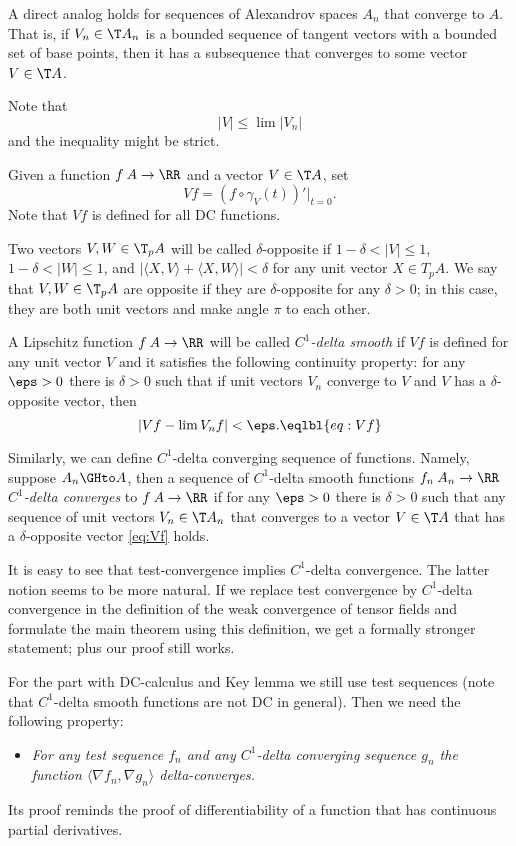 A direct analog holds for sequences of Alexandrov spaces $A_n$ that converge to $A$.
That is, if $V_n\in \T A_n$ is a bounded sequence of tangent vectors with a bounded set of base points, then it has a subsequence that converges to some vector $V\in \T A$.

Note that 
\[|V|\le \lim |V_n|\]
and the inequality might be strict.




Given a function $f\:A\to \RR$ and a vector $V\in \T A$, set
\[Vf=(f\circ\gamma_V(t))'|_{t=0}.\]
Note that $Vf$ is defined for all DC functions.

Two vectors $V,W\in \T_pA$ will be called $\delta$-opposite if
$1-\delta< |V|\le 1$,
$1-\delta< |W|\le 1$,
and $|\langle X,V\rangle +\langle X,W\rangle|<\delta$ for any unit vector $X\in T_p A$.
We say that $V,W\in \T_pA$ are opposite if they are $\delta$-opposite for any $\delta>0$;
in this case, they are both unit vectors and make angle $\pi$ to each other.  

A Lipschitz function $f\:A\to \RR$ will be called \emph{$C^1$-delta smooth} if $Vf$ is defined for any unit vector $V$ and it satisfies the following continuity property:
for any $\eps>0$ there is $\delta>0$ such that if unit vectors $V_n$ converge to $V$ and $V$ has a $\delta$-opposite vector, then 
\[|Vf-\lim V_nf|<\eps.\eqlbl{eq:Vf}\]

Similarly, we can define $C^1$-delta converging sequence of functions.
Namely, suppose $A_n\GHto A$, then a sequence of $C^1$-delta smooth functions $f_n\:A_n\to\RR$ \emph{$C^1$-delta converges} to $f\:A\to \RR$ if for any $\eps>0$ there is $\delta>0$ such that any sequence of unit vectors $V_n\in \T A_n$ that converges to a vector $V\in \T A$ that has a $\delta$-opposite vector \ref{eq:Vf} holds. 

It is easy to see that test-convergence implies $C^1$-delta convergence.
The latter notion seems to be more natural.
If we replace test convergence
by $C^1$-delta convergence
in the definition of the weak convergence of tensor fields and
formulate the main theorem using this definition, we get a formally stronger
statement; plus our proof still works.

For the part with DC-calculus and 
Key lemma we still use test sequences
(note that $C^1$-delta smooth functions are not DC in general).
Then we need the following property:
\begin{itemize}
 \item \textit{For any test sequence $f_n$ and any $C^1$-delta converging sequence $g_n$ the function
$\langle \nabla f_n , \nabla g_n
\rangle$ delta-converges.}
\end{itemize}
Its proof reminds the proof of differentiability of a function that has continuous partial derivatives. 
